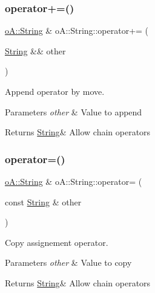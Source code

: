 \subsubsection{\texorpdfstring{operator+=()}{operator+=()}\hspace{0.1cm}{\footnotesize\ttfamily [2/2]}}
{\footnotesize\ttfamily \mbox{\hyperlink{classo_a_1_1_string}{o\+A\+::\+String}} \& o\+A\+::\+String\+::operator+= (\begin{DoxyParamCaption}\item[{\mbox{\hyperlink{classo_a_1_1_string}{String}} \&\&}]{other }\end{DoxyParamCaption})\hspace{0.3cm}{\ttfamily [noexcept]}}



Append operator by move. 


\begin{DoxyParams}{Parameters}
{\em other} & Value to append \\
\hline
\end{DoxyParams}
\begin{DoxyReturn}{Returns}
\mbox{\hyperlink{classo_a_1_1_string}{String}}\& Allow chain operators 
\end{DoxyReturn}
\mbox{\label{classo_a_1_1_string_ac979bb3953e566011543bd0ebe78e822}} 
\subsubsection{\texorpdfstring{operator=()}{operator=()}\hspace{0.1cm}{\footnotesize\ttfamily [1/2]}}
{\footnotesize\ttfamily \mbox{\hyperlink{classo_a_1_1_string}{o\+A\+::\+String}} \& o\+A\+::\+String\+::operator= (\begin{DoxyParamCaption}\item[{const \mbox{\hyperlink{classo_a_1_1_string}{String}} \&}]{other }\end{DoxyParamCaption})\hspace{0.3cm}{\ttfamily [noexcept]}}



Copy assignement operator. 


\begin{DoxyParams}{Parameters}
{\em other} & Value to copy \\
\hline
\end{DoxyParams}
\begin{DoxyReturn}{Returns}
\mbox{\hyperlink{classo_a_1_1_string}{String}}\& Allow chain operators 
\end{DoxyReturn}
\mbox{\label{classo_a_1_1_string_ab45f150390030ee04c119399a4c9fbb7}} 
